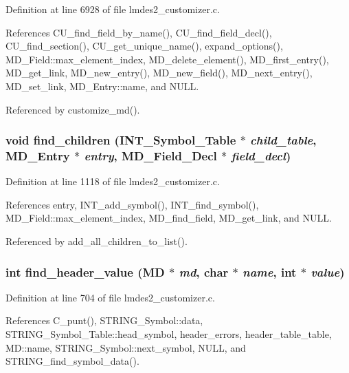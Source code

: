 Definition at line 6928 of file lmdes2\_\-customizer.c.

References CU\_\-find\_\-field\_\-by\_\-name(), CU\_\-find\_\-field\_\-decl(), CU\_\-find\_\-section(), CU\_\-get\_\-unique\_\-name(), expand\_\-options(), MD\_\-Field::max\_\-element\_\-index, MD\_\-delete\_\-element(), MD\_\-first\_\-entry(), MD\_\-get\_\-link, MD\_\-new\_\-entry(), MD\_\-new\_\-field(), MD\_\-next\_\-entry(), MD\_\-set\_\-link, MD\_\-Entry::name, and NULL.

Referenced by customize\_\-md().
\subsubsection{\setlength{\rightskip}{0pt plus 5cm}void find\_\-children (\bf{INT\_\-Symbol\_\-Table} $\ast$ {\em child\_\-table}, \bf{MD\_\-Entry} $\ast$ {\em entry}, \bf{MD\_\-Field\_\-Decl} $\ast$ {\em field\_\-decl})}\label{lmdes2__customizer_8c_f1a4477e115e0eba3990744a657173c2}




Definition at line 1118 of file lmdes2\_\-customizer.c.

References entry, INT\_\-add\_\-symbol(), INT\_\-find\_\-symbol(), MD\_\-Field::max\_\-element\_\-index, MD\_\-find\_\-field, MD\_\-get\_\-link, and NULL.

Referenced by add\_\-all\_\-children\_\-to\_\-list().
\subsubsection{\setlength{\rightskip}{0pt plus 5cm}int find\_\-header\_\-value (\bf{MD} $\ast$ {\em md}, char $\ast$ {\em name}, int $\ast$ {\em value})}\label{lmdes2__customizer_8c_3104e311f120343924d365c7d4a9f816}




Definition at line 704 of file lmdes2\_\-customizer.c.

References C\_\-punt(), STRING\_\-Symbol::data, STRING\_\-Symbol\_\-Table::head\_\-symbol, header\_\-errors, header\_\-table\_\-table, MD::name, STRING\_\-Symbol::next\_\-symbol, NULL, and STRING\_\-find\_\-symbol\_\-data().

